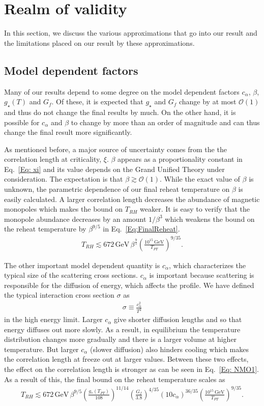 \documentclass[superscriptaddress,groupedaddress,nofootnoteinbib,11pt]{article}
\newcommand\eea{\end{eqnarray}}
\newcommand\bea{\begin{eqnarray}}
\def\l{\left(}
\def\r{\right)}
\begin{document}
\section{Realm of validity}
\label{Sec: approx}

In this section, we discuss the various approximations that go into our result and the limitations placed on our result by these approximations.

\subsection{Model dependent factors}

Many of our results depend to some degree on the model dependent factors $c_{\alpha}$, $\beta$, $g_\star(T)$ and $G_f$.  
Of these, it is expected that $g_\star$ and $G_f$ change by at most $\mathcal{O}(1)$ and thus do not change the final results by much.
On the other hand, it is possible for $c_{\alpha}$ and $\beta$ to change by more than an order of magnitude and can thus change the final result more significantly.

As mentioned before, a major source of uncertainty comes from the the correlation length at criticality, $\xi$.  $\beta$ appears as a proportionality constant in Eq.~\ref{Eq: xi} and its value depends on the Grand Unified Theory under consideration.  The expectation is that $\beta \gtrsim \mathcal{O}(1)$.  
While the exact value of $\beta$ is unknown, the parametric dependence of our final reheat temperature on $\beta$ is easily calculated. A larger correlation length decreases the abundance of magnetic monopoles which makes the bound on $T_{RH}$ weaker.  It is easy to verify that the monopole abundance decreases by an amount $1/\beta^3$ which weakens the bound on the reheat temperature by $\beta^{9/5}$ in  Eq.~\ref{Eq:FinalReheat}.
\bea
T_{RH} \lesssim 672 \, \text{GeV} \, \beta^{\frac{9}{5}} \left ( \frac{10^{15} \, \text{GeV}}{T_{PT}} \right )^{9/35}.
\eea

The other important model dependent quantity is $c_{\alpha}$, which characterizes the typical size of the scattering cross sections.  $c_{\alpha}$ is important because scattering is responsible for the diffusion of energy, which affects the profile.  We have defined the typical interaction cross section $\sigma$ as
\bea
\sigma\equiv \frac{c_{\alpha}^2}{T^2}
\eea
in the high energy limit.  
Larger $c_{\alpha}$ give shorter diffusion lengths and so that energy diffuses out more slowly.
As a result, in equilibrium the temperature distribution changes more gradually and there is a larger volume at higher temperature.  But larger $c_{\alpha}$ (slower diffusion) also hinders cooling which makes the correlation length at freeze out at larger values. Between these two effects, the effect on the correlation length is stronger as can be seen in Eq.~\ref{Eq: NMO1}.
As a result of this, the final bound on the reheat temperature scales as
\bea
T_{RH} \lesssim 672 \, \text{GeV} \, \beta^{9/5}\l\frac{g_*(T_{PT})}{108}\r^{11/14} \l\frac{G_f}{3.8}\r^{4/35}\l 10c_{\alpha}\r^{36/35} \left ( \frac{10^{15} \, \text{GeV}}{T_{PT}} \right )^{9/35}.
\eea
\end{document}
